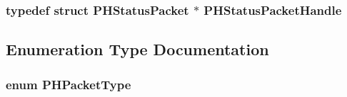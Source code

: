 \hypertarget{group___tau_labs_libraries_gaba4b593b2564f247de7ae01fe86e908a}{
\subsubsection[{\-P\-H\-Status\-Packet\-Handle}]{\setlength{\rightskip}{0pt plus 5cm}typedef  struct {\bf \-P\-H\-Status\-Packet} $\ast$ {\bf \-P\-H\-Status\-Packet\-Handle}}}\label{group___tau_labs_libraries_gaba4b593b2564f247de7ae01fe86e908a}


\subsection{\-Enumeration \-Type \-Documentation}
\hypertarget{group___tau_labs_libraries_gafc6fe85f3c89dabc11ae43c825fb28ad}{
\subsubsection[{\-P\-H\-Packet\-Type}]{\setlength{\rightskip}{0pt plus 5cm}enum {\bf \-P\-H\-Packet\-Type}}}\label{group___tau_labs_libraries_gafc6fe85f3c89dabc11ae43c825fb28ad}
